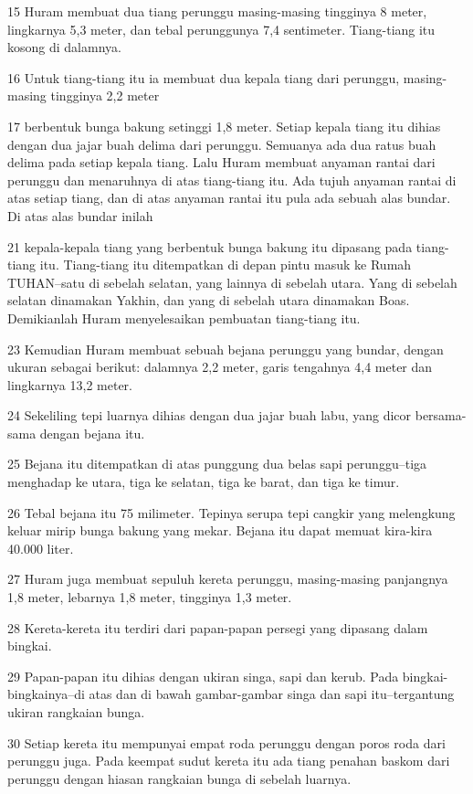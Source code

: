 \par 15 Huram membuat dua tiang perunggu masing-masing tingginya 8 meter, lingkarnya 5,3 meter, dan tebal perunggunya 7,4 sentimeter. Tiang-tiang itu kosong di dalamnya.
\par 16 Untuk tiang-tiang itu ia membuat dua kepala tiang dari perunggu, masing-masing tingginya 2,2 meter
\par 17 berbentuk bunga bakung setinggi 1,8 meter. Setiap kepala tiang itu dihias dengan dua jajar buah delima dari perunggu. Semuanya ada dua ratus buah delima pada setiap kepala tiang. Lalu Huram membuat anyaman rantai dari perunggu dan menaruhnya di atas tiang-tiang itu. Ada tujuh anyaman rantai di atas setiap tiang, dan di atas anyaman rantai itu pula ada sebuah alas bundar. Di atas alas bundar inilah
\par 21 kepala-kepala tiang yang berbentuk bunga bakung itu dipasang pada tiang-tiang itu. Tiang-tiang itu ditempatkan di depan pintu masuk ke Rumah TUHAN--satu di sebelah selatan, yang lainnya di sebelah utara. Yang di sebelah selatan dinamakan Yakhin, dan yang di sebelah utara dinamakan Boas. Demikianlah Huram menyelesaikan pembuatan tiang-tiang itu.
\par 23 Kemudian Huram membuat sebuah bejana perunggu yang bundar, dengan ukuran sebagai berikut: dalamnya 2,2 meter, garis tengahnya 4,4 meter dan lingkarnya 13,2 meter.
\par 24 Sekeliling tepi luarnya dihias dengan dua jajar buah labu, yang dicor bersama-sama dengan bejana itu.
\par 25 Bejana itu ditempatkan di atas punggung dua belas sapi perunggu--tiga menghadap ke utara, tiga ke selatan, tiga ke barat, dan tiga ke timur.
\par 26 Tebal bejana itu 75 milimeter. Tepinya serupa tepi cangkir yang melengkung keluar mirip bunga bakung yang mekar. Bejana itu dapat memuat kira-kira 40.000 liter.
\par 27 Huram juga membuat sepuluh kereta perunggu, masing-masing panjangnya 1,8 meter, lebarnya 1,8 meter, tingginya 1,3 meter.
\par 28 Kereta-kereta itu terdiri dari papan-papan persegi yang dipasang dalam bingkai.
\par 29 Papan-papan itu dihias dengan ukiran singa, sapi dan kerub. Pada bingkai-bingkainya--di atas dan di bawah gambar-gambar singa dan sapi itu--tergantung ukiran rangkaian bunga.
\par 30 Setiap kereta itu mempunyai empat roda perunggu dengan poros roda dari perunggu juga. Pada keempat sudut kereta itu ada tiang penahan baskom dari perunggu dengan hiasan rangkaian bunga di sebelah luarnya.
